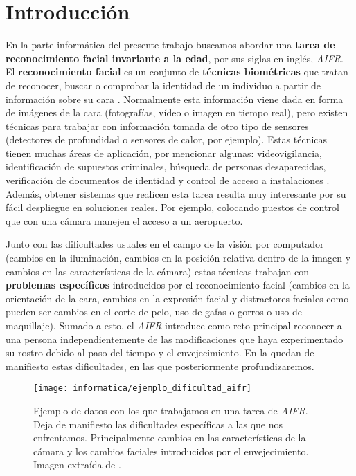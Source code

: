 \chapter{Introducción} \label{ich:introduccion}

En la parte informática del presente trabajo buscamos abordar una \textbf{tarea de reconocimiento facial invariante a la edad}, por sus siglas en inglés, \textit{AIFR}. El \textbf{reconocimiento facial} es un conjunto de \textbf{técnicas biométricas} que tratan de reconocer, buscar o comprobar  la identidad de un individuo a partir de información sobre su cara \cite{informatica:definicion_face_recognition}. Normalmente esta información viene dada en forma de imágenes de la cara (fotografías, vídeo o imagen en tiempo real), pero existen técnicas para trabajar con información tomada de otro tipo de sensores (detectores de profundidad o  sensores de calor, por ejemplo). Estas técnicas tienen muchas áreas de aplicación, por mencionar algunas: videovigilancia, identificación de supuestos criminales, búsqueda de personas desaparecidas, verificación de documentos de identidad y control de acceso a instalaciones \cite{informatica:deep_fr_survey} \cite{informatica:aifr_survey}. Además, obtener sistemas que realicen esta tarea resulta muy interesante por su fácil despliegue en soluciones reales. Por ejemplo, colocando puestos de control que con una cámara manejen el acceso a un aeropuerto.

Junto con las dificultades usuales en el campo de la visión por computador (cambios en la iluminación, cambios en la posición relativa dentro de la imagen y cambios en las características de la cámara) estas técnicas trabajan con \textbf{problemas específicos} introducidos por el reconocimiento facial (cambios en la orientación de la cara, cambios en la expresión facial y distractores faciales como pueden ser cambios en el corte de pelo, uso de gafas o gorros o uso de maquillaje). Sumado a esto, el \textit{AIFR} introduce como reto principal reconocer a una persona independientemente de las modificaciones que haya experimentado su rostro debido al paso del tiempo y el envejecimiento. En la  quedan de manifiesto estas dificultades, en las que posteriormente profundizaremos.

\begin{figure}[h]
	\centering
	\texttt{[image: informatica/ejemplo\_dificultad\_aifr]}
	\caption{Ejemplo de datos con los que trabajamos en una tarea de \textit{AIFR}. Deja de manifiesto las dificultades específicas a las que nos enfrentamos. Principalmente cambios en las características de la cámara y los cambios faciales introducidos por el envejecimiento. Imagen extraída de \cite{informatica:aifr_survey}.}
	\label{img:ejemplo_dificultad_aifr}
\end{figure}

